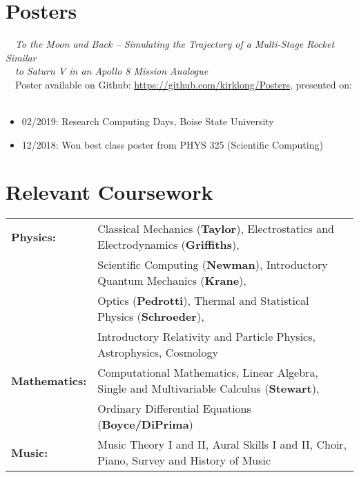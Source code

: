\documentclass[11pt]{article}
\begin{document}
\section{Posters}
\-\ \-\ \textit{To the Moon and Back -- Simulating the Trajectory of a Multi-Stage Rocket Similar} \\
\-\ \-\ \textit{to Saturn V in an Apollo 8 Mission Analogue}\vspace{1mm}\\
\-\ \-\ Poster available on Github: \url{https://github.com/kirklong/Posters}, presented on:
\-\ \-\ \begin{itemize}[noitemsep]
              \item 02/2019: Research Computing Days, Boise State University
              \item 12/2018: Won best class poster from PHYS 325 (Scientific Computing)
        \end{itemize}

\section{Relevant Coursework}
\begin{tabular}{ll}
\textbf{Physics:} &   Classical Mechanics (\textbf{Taylor}), Electrostatics and Electrodynamics (\textbf{Griffiths}), \\
                  &   Scientific Computing (\textbf{Newman}), Introductory Quantum Mechanics (\textbf{Krane}), \\
                  &   Optics (\textbf{Pedrotti}), Thermal and Statistical Physics (\textbf{Schroeder}),\\
                  &   Introductory Relativity and Particle Physics, Astrophysics, Cosmology \vspace{1mm} \\
\textbf{Mathematics:} &   Computational Mathematics, Linear Algebra, Single and Multivariable Calculus (\textbf{Stewart}),\\
                      &   Ordinary Differential Equations (\textbf{Boyce/DiPrima}) \vspace{1mm} \\
\textbf{Music:}   &   Music Theory I and II, Aural Skills I and II, Choir, Piano, Survey and History of Music \\
\end{tabular}
\end{document}
